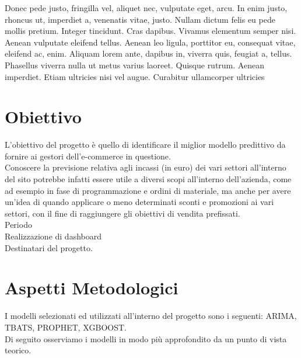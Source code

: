 \documentclass[12pt, a4paper, twocolumn]{article} %
\begin{document}
Donec pede justo, fringilla vel, aliquet nec, vulputate eget, arcu. In enim justo, rhoncus ut, imperdiet a, venenatis vitae, justo. Nullam dictum felis eu pede mollis pretium. Integer tincidunt. Cras dapibus. Vivamus elementum semper nisi. Aenean vulputate eleifend tellus. Aenean leo ligula, porttitor eu, consequat vitae, eleifend ac, enim. Aliquam lorem ante, dapibus in, viverra quis, feugiat a, tellus. Phasellus viverra nulla ut metus varius laoreet. Quisque rutrum. Aenean imperdiet. Etiam ultricies nisi vel augue. Curabitur ullamcorper ultricies 

\section{Obiettivo}
L'obiettivo del progetto è quello di identificare il miglior modello predittivo da fornire ai gestori dell'e-commerce in questione.\\
Conoscere la previsione relativa agli incassi (in euro) dei vari settori all'interno del sito potrebbe infatti essere utile a diversi scopi all'interno dell'azienda, come ad esempio in fase di programmazione e ordini di materiale, ma anche per avere un'idea di quando applicare o meno determinati sconti e promozioni ai vari settori, con il fine di raggiungere gli obiettivi di vendita prefissati.\\
Periodo\\
Realizzazione di dashboard\\
Destinatari del progetto.

\section{Aspetti Metodologici}
I modelli selezionati ed utilizzati all'interno del progetto sono i seguenti: ARIMA, TBATS, PROPHET, XGBOOST.\\
Di seguito osserviamo i modelli in modo più approfondito da un punto di vista teorico.
\end{document}
